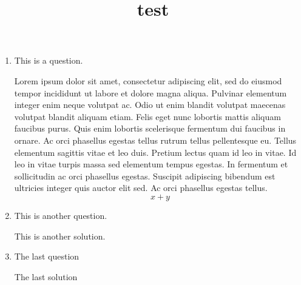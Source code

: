 \documentclass[12pt, letterpaper]{worksheet}
\title{test}
\begin{document}
\maketitle

\begin{enumerate}
  \item This is a question.
  \begin{solution}{3in}
    Lorem ipsum dolor sit amet, consectetur adipiscing elit, sed do eiusmod tempor incididunt ut labore et dolore magna aliqua. Pulvinar elementum integer enim neque volutpat ac. Odio ut enim blandit volutpat maecenas volutpat blandit aliquam etiam. Felis eget nunc lobortis mattis aliquam faucibus purus. Quis enim lobortis scelerisque fermentum dui faucibus in ornare. Ac orci phasellus egestas tellus rutrum tellus pellentesque eu. Tellus elementum sagittis vitae et leo duis. Pretium lectus quam id leo in vitae. Id leo in vitae turpis massa sed elementum tempus egestas. In fermentum et sollicitudin ac orci phasellus egestas. Suscipit adipiscing bibendum est ultricies integer quis auctor elit sed. Ac orci phasellus egestas tellus.
    \[x + y\]
  \end{solution}
  \item This is another question.
  \begin{solution}{3in}
    This is another solution.
  \end{solution}
  \newpage
  \item The last question
  \begin{solution}{3in}
    The last solution
  \end{solution}
\end{enumerate}
\end{document}
